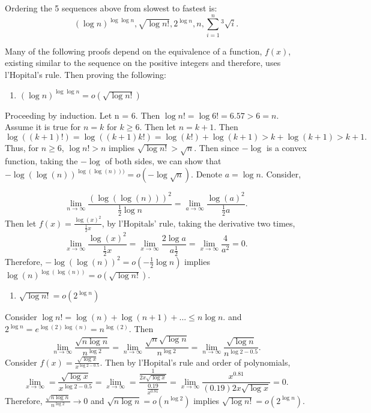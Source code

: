 \documentclass[12pt,]{article}
\providecommand{\tightlist}{%
  \setlength{\itemsep}{0pt}\setlength{\parskip}{0pt}}
\begin{document}
Ordering the 5 sequences above from slowest to fastest is:
\[(\log n)^{\log\log n}, \sqrt{\log n!}, 2^{\log n}, n,\sum_{i = 1}^n {^3\sqrt{i}}.\]
\newpage

Many of the following proofs depend on the equivalence of a function,
\(f(x)\), existing similar to the sequence on the positive integers and
therefore, uses l'Hopital's rule. Then proving the following:

\begin{enumerate}
\def\labelenumi{(\arabic{enumi})}
\tightlist
\item
  \((\log n)^{\log\log n} =o\left(\sqrt{\log n!}\right)\)
\end{enumerate}

Proceeding by induction. Let n = 6. Then
\(\log n! = \log 6! = 6.57 > 6 = n.\) Assume it is true for \(n = k\)
for \(k\ge6.\) Then let \(n = k+1\). Then
\(\log((k+1)!) = \log((k+1)k!) = \log(k!) + \log(k+1) > k + \log(k+1) > k+1.\)
Thus, for \(n\ge 6\), \(\log n! > n\) implies
\(\sqrt{\log n!} > \sqrt{n}.\) Then since \(-\log\) is a convex
function, taking the \(-\log\) of both sides, we can show that
\(-\log(\log(n))^{\log(\log(n)))} = o\left(-\log{\sqrt{n}}\right).\)
Denote \(a = \log n.\) Consider,

\[\lim_{n\rightarrow\infty} \frac{(\log(\log(n)))^2}{\frac{1}{2}\log n}=\lim_{a\rightarrow \infty}\frac{\log(a)^2}{\frac{1}{2}a}.\]
Then let \(f(x) = \frac{\log(x)^2}{\frac{1}{2}x}\), by l'Hopitals' rule,
taking the derivative two times,\\
\[\lim_{x\rightarrow\infty} \frac{\log(x)^2}{\frac{1}{2}x} = \lim_{x\rightarrow\infty}\frac{2\log a}{a\frac{1}{2}}=\lim_{x\rightarrow\infty}\frac{4}{a^2}=0.\]
Therefore, \(-\log(\log(n))^2 = o\left(-\frac{1}{2}\log n\right)\)
implies \(\log(n)^{\log(\log(n))}=o\left(\sqrt{\log n!}\right)\).

\begin{enumerate}
\def\labelenumi{(\arabic{enumi})}
\setcounter{enumi}{1}
\tightlist
\item
  \(\sqrt{\log n!}=o\left( 2^{\log n}\right)\)
\end{enumerate}

Consider \(\log n! = \log(n) + \log(n+1) + ...\le n\log n.\) and
\(2^{\log n} = e^{\log(2)\log(n)} = n^{\log(2)}.\) Then
\[\lim_{n\rightarrow \infty}\frac{\sqrt{n\log n}}{n^{\log 2}} =\lim_{n\rightarrow \infty}\frac{\sqrt{n}\sqrt{\log n}}{n^{\log 2}}=\lim_{n\rightarrow \infty}\frac{\sqrt{\log n}}{n^{\log 2 - 0.5}}.\]
Consider \(f(x) = \frac{\sqrt{\log x}}{x^{\log 2 - 0.5}}.\) Then by
l'Hopital's rule and order of polynomials,
\[\lim_{x\rightarrow\infty} = \frac{\sqrt{\log x}}{x^{\log 2 - 0.5}} = \lim_{x\rightarrow\infty} = \frac{\frac{1}{2x\sqrt{\log x}}}{\frac{0.19}{x^{0.81}}}=\lim_{x\rightarrow\infty}\frac{x^{0.81}}{(0.19)2x\sqrt{\log x}} = 0.\]
Therefore, \(\frac{\sqrt{n\log n}}{n^{\log 2}}\rightarrow 0\) and
\(\sqrt{n\log n}=o\left( n^{\log 2}\right)\) implies
\(\sqrt{\log n!}=o\left( 2^{\log n}\right)\).
\end{document}
